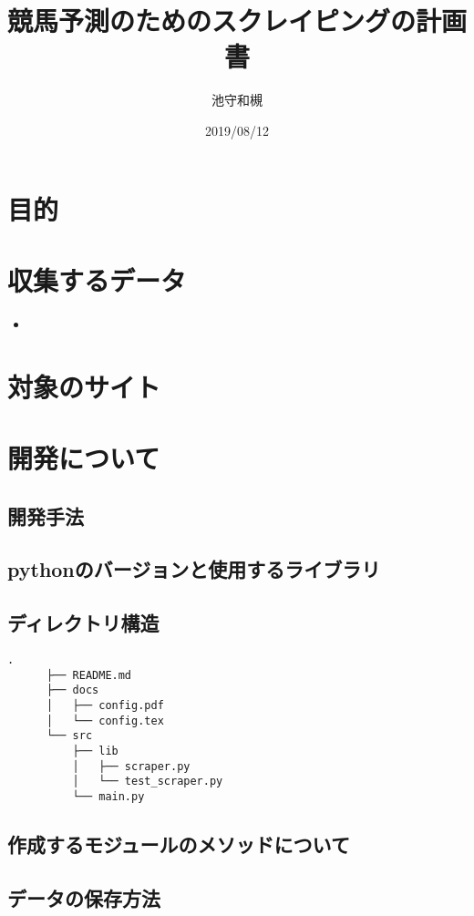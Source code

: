 \documentclass{jsarticle}
\begin{document}
\title{競馬予測のためのスクレイピングの計画書}
\author{池守和槻}
\date{2019/08/12}
\maketitle

\section{目的}
\section{収集するデータ}
  \begin{itemize}
    \item 
  \end{itemize}
\section{対象のサイト}
\section{開発について}
  \subsection{開発手法}
  \subsection{pythonのバージョンと使用するライブラリ}
  \subsection{ディレクトリ構造}
    \begin{lstlisting}[caption=プロジェクトのディレクトリ構造,label=ラベル]
      .
      ├── README.md
      ├── docs
      │   ├── config.pdf
      │   └── config.tex
      └── src
          ├── lib
          │   ├── scraper.py
          │   └── test_scraper.py
          └── main.py
    \end{lstlisting}

  \subsection{作成するモジュールのメソッドについて}
  \subsection{データの保存方法}
\end{document}

